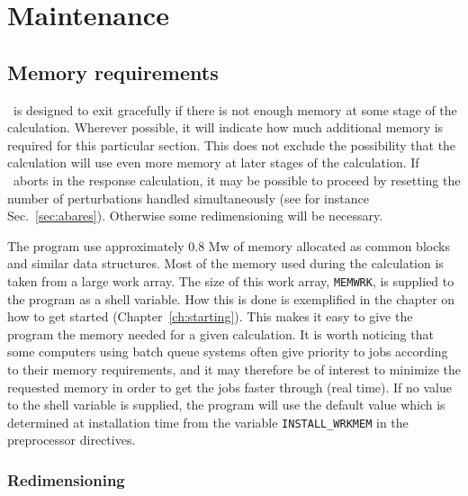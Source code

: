 \chapter{Maintenance}\label{ch:maintain}

\section{Memory requirements}

\siraba\ is designed to exit gracefully if there is not enough
memory at some stage of the calculation.  Wherever possible, it
will indicate how much additional memory is required for this
particular section.  This does not exclude the possibility that
the calculation will use even more memory at later stages of the
calculation. If \siraba\ aborts in the response calculation, it
may be possible to proceed by resetting the number of
perturbations handled simultaneously (see for instance
Sec.~\ref{sec:abares}).  Otherwise some redimensioning will be
necessary.

The program use approximately 0.8 Mw of memory allocated as common
blocks and similar data structures. Most of the memory used during the
calculation is taken from a large work array. The size of this work
array,
\verb|MEMWRK|, is supplied to the program as a shell
variable. How this is done is
exemplified in the chapter on how to get started
(Chapter~\ref{ch:starting}). This makes it easy
to give the program the memory needed for a given calculation. It is
worth noticing that some computers using batch queue systems often
give priority to jobs according to their memory requirements, and it may
therefore be of interest to minimize the requested memory in order to
get the jobs faster through (real time). If no value to the shell
variable is supplied, the program will use the  default value which is
determined at installation time from the variable
\verb|INSTALL_WRKMEM| in the preprocessor
directives.

\subsection{Redimensioning  \siraba}

